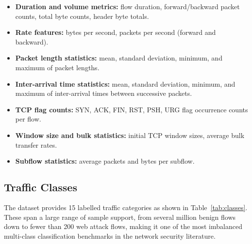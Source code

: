 \documentclass[12pt]{article}
\theoremstyle{plain}
\begin{document}
\begin{itemize}
    \item \textbf{Duration and volume metrics:} flow duration, forward/backward packet counts, total byte counts, header byte totals.
    \item \textbf{Rate features:} bytes per second, packets per second (forward and backward).
    \item \textbf{Packet length statistics:} mean, standard deviation, minimum, and maximum of packet lengths.
    \item \textbf{Inter-arrival time statistics:} mean, standard deviation, minimum, and maximum of inter-arrival times between successive packets.
    \item \textbf{TCP flag counts:} SYN, ACK, FIN, RST, PSH, URG flag occurrence counts per flow.
    \item \textbf{Window size and bulk statistics:} initial TCP window sizes, average bulk transfer rates.
    \item \textbf{Subflow statistics:} average packets and bytes per subflow.
\end{itemize}

\subsection{Traffic Classes}

The dataset provides 15 labelled traffic categories as shown in Table~\ref{tab:classes}. These span a large range of sample support, from several million benign flows down to fewer than 200 web attack flows, making it one of the most imbalanced multi-class classification benchmarks in the network security literature.
\end{document}
